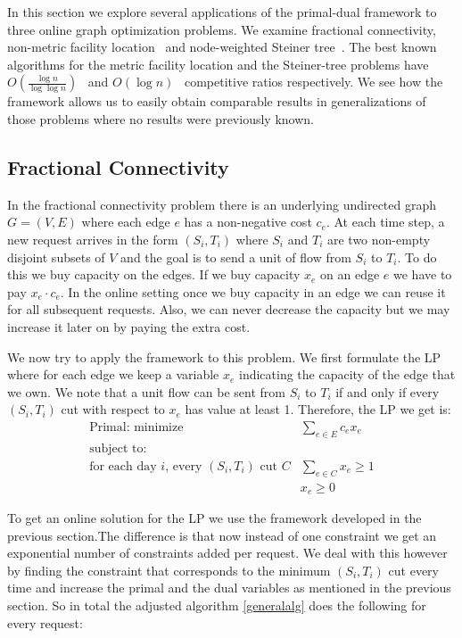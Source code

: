 In this section we explore several applications of the primal-dual framework to three online graph optimization problems. We examine fractional connectivity, non-metric facility location~\cite{Alon06:opt} and node-weighted Steiner tree~\cite{naor11:node-weighted-steiner-tree}. The best known algorithms for the metric facility location and the Steiner-tree problems have $O(\frac{ \log n }{ \log \log n} )$~\cite{fotakis03:facility} and $O({ \log n} )$~\cite{imase91:dynamic-steiner} competitive ratios respectively. We see how the framework allows us to easily obtain comparable results in generalizations of those problems where no results were previously known.

\subsection{Fractional Connectivity}

In the fractional connectivity problem there is an underlying undirected graph $G = (V,E)$ where each edge $e$ has a non-negative cost $c_e$. At each time step, a new request arrives in the form $(S_i,T_i)$ where $S_i$ and $T_i$ are two non-empty disjoint subsets of $V$ and the goal is to send a unit of flow from $S_i$ to $T_i$. To do this we buy capacity on the edges. If we buy capacity $x_e$ on an edge $e$ we have to pay $x_e \cdot c_e$. In the online setting once we buy capacity in an edge we can reuse it for all subsequent requests. Also, we can never decrease the capacity but we may increase it later on by paying the extra cost.

We now try to apply the framework to this problem. We first formulate the LP where for each edge we keep a variable $x_e$ indicating the capacity of the edge that we own. We note that a unit flow can be sent from $S_i$ to $T_i$ if and only if every $(S_i, T_i)$ cut with respect to $x_e$ has value at least 1. Therefore, the LP we get is: 
\[
	\begin{array}{lr}
	\textrm{Primal: minimize}   & \sum_{e \in E} c_e x_e   \\
	\textrm{subject to:} & \\
	\textrm{for each day $i$, every $(S_i,T_i)$ cut $C$} & \sum_{e \in C} x_e  \ge 1  \\
			    & x_e \geq 0
	\end{array}
\]

To get an online solution for the LP we use the framework developed in the previous section.The difference is that now instead of one constraint we get an exponential number of constraints added per request. We deal with this however by finding the constraint that corresponds to the minimum $(S_i,T_i)$ cut every time and increase the primal and the dual variables as mentioned in the previous section. So in total the adjusted algorithm \ref{generalalg} does the following for every request:

